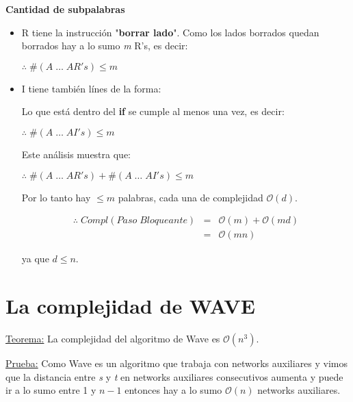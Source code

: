 \documentclass[12pt,a4paper]{report}
\begin{document}
		\textbf{Cantidad de subpalabras}
		\begin{itemize}
			\item R tiene la instrucción "\textbf{borrar lado}". Como los lados borrados quedan borrados hay a lo sumo \textit{m} R's, es decir:
			\begin{center}
				$ \therefore \; \# (A \; \dotsc \; AR's) \leq m $
			\end{center}
			
			\item I tiene también línes de la forma:
				\begin{algorithmic}
					\If{$\dotsc$}
    				\EndIf
				\end{algorithmic}
			 	
			 	Lo que está dentro del \textbf{if} se cumple al menos una vez, es decir:
			 	\begin{center}
					$ \therefore \; \# (A \; \dotsc \; AI's) \leq m $
				\end{center}
			
			Este análisis muestra que:
			\begin{center}
					$ \therefore \; \# (A \; \dotsc \; AR's) + \# (A \; \dotsc \; AI's) \leq m $
				\end{center}
			
			Por lo tanto hay $\leq m$ palabras, cada una de complejidad $\mathcal{O}(d)$.

			\begin{eqnarray}
			\nonumber \therefore \;  Compl(Paso \; Bloqueante) & = & \mathcal{O}(m) + \mathcal{O}(md) \\
			\nonumber & = & \mathcal{O}(mn)
		\end{eqnarray}
		
		ya que $d \leq n$.			
		\end{itemize}
		

	\section{La complejidad de WAVE}

		\underline{Teorema:} La complejidad del algoritmo de Wave es $\mathcal{O}(n^{3})$.
		
		\underline{Prueba:} Como Wave es un algoritmo que trabaja con networks auxiliares y vimos que la distancia entre \textit{s} y \textit{t} en networks auxiliares consecutivos aumenta y puede ir a lo sumo entre 1 y $n-1$ entonces hay a lo sumo $\mathcal{O}(n)$ networks auxiliares.
\end{document}
